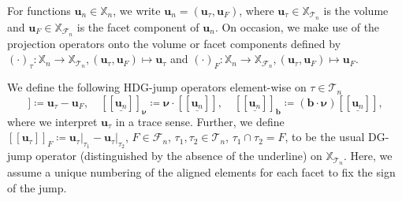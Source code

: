 \documentclass{m2an}
\newcommand{\nv}{\boldsymbol{\nu}}
\newcommand{\bflow}{\mathbf{b}}
\renewcommand{\u}{\mathbf{u}}
\newcommand{\calT}{\mathcal{T}}
\newcommand{\X}{\mathbb{X}}
\newcommand{\Xn}{\mathbb{X}_n}
\newcommand{\XT}{\X_{\mathcal{T}_n}}
\newcommand{\XF}{\X_{\mathcal{F}_n}}
\newcommand{\jump}[1]{[\![ #1 ]\!]}
\newcommand{\hdgjump}[1]{[\![\underline{#1} ]\!]}
\newcommand{\Tn}{\calT_n}
\newcommand{\Fn}{\mathcal{F}_n}
\newcommand{\PVol}[1]{(#1)_{\tau}}
\newcommand{\PFac}[1]{(#1)_{F}}
\theoremstyle{plain}
\theoremstyle{definition}
\begin{document}
For functions $\u_n \in \Xn$, we write $\u_n = (\u_{\tau}, \u_{F})$, where $\u_{\tau} \in \XT$ is the volume and $\u_F \in \XF$ is the facet component of $\u_n$. On occasion, we make use of the projection operators onto the volume or facet components defined by $\PVol{\cdot} \colon \Xn \to \XT, (\u_{\tau},\u_{F}) \mapsto \u_{\tau}$ and $\PFac{\cdot} \colon \Xn \to \XF, (\u_{\tau},\u_{F}) \mapsto \u_{F}$. 


We define the following HDG-jump operators element-wise on $\tau \in \Tn$
\begin{equation}
   \hdgjump{\u_n} \coloneqq  \u_{\tau} - \u_F, \quad \hdgjump{\u_n}_{\nv} \coloneqq \nv \cdot \hdgjump{\u_n}, \quad \hdgjump{\u_n}_{\bflow} \coloneqq (\bflow \cdot \nv) \hdgjump{\u_n}, 
\end{equation}
where we interpret $\u_{\tau}$ in a trace sense. Further, we define $\jump{\u_{\tau}}_F \coloneqq \u_{\tau} \vert_{\tau_1} - \u_{\tau} \vert_{\tau_2}$, $F \in \Fn$, $\tau_1,\tau_2 \in \Tn$, $\tau_1 \cap \tau_2 = F$, to be the usual DG-jump operator (distinguished by the absence of the underline) on $\XT$. Here, we assume a unique numbering of the aligned elements for each facet to fix the sign of the jump.
\end{document}
